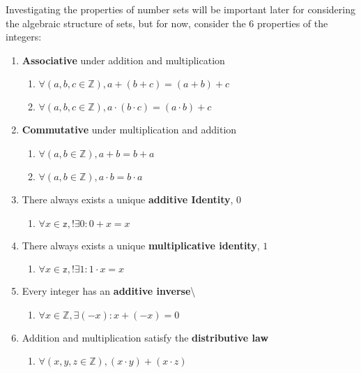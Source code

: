 \documentclass[
]{article}
\begin{document}
Investigating the properties of number sets will be important later for
considering the algebraic structure of sets, but for now, consider the 6
properties of the integers:

\begin{enumerate}
\def\labelenumi{\arabic{enumi}.}
\item
  \textbf{Associative} under addition and multiplication

  \begin{enumerate}
  \def\labelenumii{\arabic{enumii}.}
  \item
    \(\forall (a,b,c \in \mathbb{Z}), a + (b+c) = (a+b) + c\)
  \item
    \(\forall (a,b,c \in \mathbb{Z}), a \cdot (b\cdot c) = (a\cdot b) + c\)
  \end{enumerate}
\item
  \textbf{Commutative} under multiplication and addition

  \begin{enumerate}
  \def\labelenumii{\arabic{enumii}.}
  \item
    \(\forall (a,b \in \mathbb{Z}),  a + b = b + a\)
  \item
    \(\forall (a,b \in \mathbb{Z}),  a \cdot b = b \cdot a\)
  \end{enumerate}
\item
  There always exists a unique \textbf{additive Identity}, \(0\)

  \begin{enumerate}
  \def\labelenumii{\arabic{enumii}.}
  \item
    \(\forall x \in \mathbb{z}, !\exists 0 : 0+x=x\)
  \end{enumerate}
\item
  There always exists a unique \textbf{multiplicative identity}, \(1\)

  \begin{enumerate}
  \def\labelenumii{\arabic{enumii}.}
  \item
    \(\forall x \in \mathbb{z}, !\exists 1 : 1\cdot x=x\)
  \end{enumerate}
\item
  Every integer has an \textbf{additive inverse}\textbackslash{}

  \begin{enumerate}
  \def\labelenumii{\arabic{enumii}.}
  \item
    \(\forall x \in \mathbb{Z}, \exists (-x) : x + (-x) = 0\)
  \end{enumerate}
\item
  Addition and multiplication satisfy the \textbf{distributive law}

  \begin{enumerate}
  \def\labelenumii{\arabic{enumii}.}
  \item
    \(\forall (x,y,z \in \mathbb{Z}), (x\cdot y) + (x\cdot z)\)
  \end{enumerate}
\end{enumerate}
\end{document}

